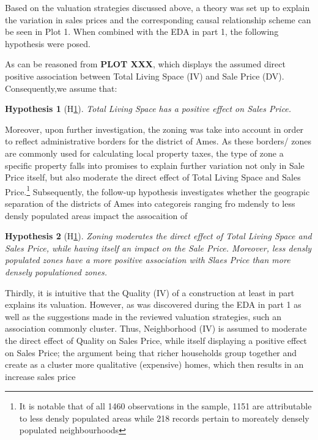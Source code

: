 \documentclass{article}
\newtheorem{hyp}{Hypothesis}
\begin{document}
Based on the valuation strategies discussed above, a theory was set up to explain the variation in sales prices and the corresponding causal relationship scheme can be seen in Plot 1. 
When combined with the EDA in part 1, the following hypothesis were posed.

\indent As can be reasoned from \textbf{PLOT XXX}, which displays the assumed direct positive association between Total Living Space (IV) and Sale Price (DV). Consequently,we assume that:

\begin{hyp}[H\ref{hyp:first}] \label{hyp:first}
Total Living Space has a positive effect on Sales Price.
\end{hyp}

\begin{center}
\end{center}


\indent Moreover, upon further investigation, the zoning was take into account in order to reflect administrative borders for the district of Ames. As these borders/ zones are commonly used for calculating local property taxes, the type of zone a specific property falls into promises to explain further variation not only in Sale Price itself, but also moderate the direct effect of Total Living Space and Sales Price.\footnote{It is notable that of all 1460 observations in the sample, 1151 are attributable to less densly populated areas while 218 records pertain to moreately densely populated neighbourhoods} Subsequently, the follow-up hypothesis investigates whether the geograpic separation of the districts of Ames into categoreis ranging fro mdensly to less densly populated areas impact the assocaition of 

\begin{hyp}[H\ref{hyp:first}] \label{hyp:second}
Zoning moderates the direct effect of Total Living Space and Sales Price, while having itself an impact on the Sale Price. Moreover, less densly populated zones have a more positive association with Slaes Price than more densely populationed zones.
\end{hyp}

\indent Thirdly, it is intuitive that the Quality (IV) of a construction at least in part explains its valuation. However, as was discovered during the EDA in part 1 as well as the suggestions made in the reviewed valuation strategies, such an association commonly cluster. Thus, Neighborhood (IV) is assumed to moderate the direct effect of Quality on Sales Price, while itself displaying a positive effect on Sales Price; the argument being that richer households group together and create as a cluster more qualitative (expensive) homes, which then results in an increase sales price 
\end{document}
